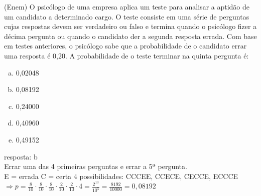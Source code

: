 \begin{ex}
  (Enem) O psicólogo de uma empresa aplica um teste para analisar a aptidão de um candidato a determinado cargo. O teste consiste em uma série de perguntas cujas respostas devem ser verdadeiro ou falso e termina quando o psicólogo fizer a décima pergunta ou quando o candidato der a segunda resposta errada. Com base em testes anteriores, o psicólogo sabe que a probabilidade de o candidato errar uma resposta é 0,20. A probabilidade de o teste terminar na quinta pergunta é:
    \begin{enumerate} [(a)]
        \item 0,02048
        \item 0,08192
        \item 0,24000
        \item 0,40960
        \item 0,49152
    \end{enumerate}
      \begin{sol}
       resposta: b \\
       Errar uma das 4 primeiras perguntas e errar a 5ª pergunta.\\
       E = errada C = certa \hspace{0,5cm} 4 possibilidades: CCCEE, CCECE, CECCE, ECCCE\\ $\Longrightarrow p=\frac{8}{10}\cdot\frac{8}{10}\cdot\frac{8}{10}\cdot\frac{2}{10}\cdot\frac{2}{10}\cdot4=\frac{2^{13}}{10^5}=\frac{8192}{10000}=0,08192$
      
      \end{sol}
    \end{ex}